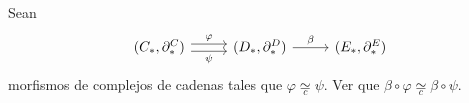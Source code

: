 \begin{ejercicio}
Sean
\[
\begin{tikzcd}[column sep=2.6em]
(C_*, \partial_*^C) \arrow[r, shift left=0.6ex, "\varphi"] \arrow[r, shift right=0.6ex, "\psi"'] & (D_*, \partial_*^D) \arrow[r, "\beta"] & (E_*, \partial_*^E)
\end{tikzcd}
\]
morfismos de complejos de cadenas tales que $\varphi \underset{c}{\simeq} \psi$. Ver que $\beta \circ \varphi \underset{c}{\simeq} \beta \circ \psi$.
\end{ejercicio}

\begin{demostracion}

\end{demostracion}
